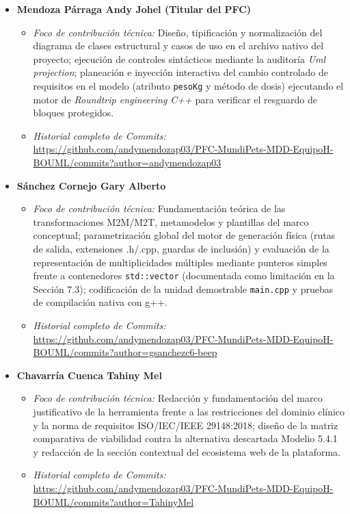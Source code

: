 \documentclass[journal,onecolumn]{IEEEtran}
\begin{document}
	\begin{itemize}[leftmargin=*]
		\item \textbf{Mendoza Párraga Andy Johel (Titular del PFC)}
		\begin{itemize}
			\item \textit{Foco de contribución técnica:} Diseño, tipificación y normalización del diagrama de clases estructural y casos de uso en el archivo nativo del proyecto; ejecución de controles sintácticos mediante la auditoría \textit{Uml projection}; planeación e inyección interactiva del cambio controlado de requisitos en el modelo (atributo \texttt{pesoKg} y método de dosis) ejecutando el motor de \textit{Roundtrip engineering C++} para verificar el resguardo de bloques protegidos.
			\item \textit{Historial completo de Commits:} \\
			\url{https://github.com/andymendozap03/PFC-MundiPets-MDD-EquipoH-BOUML/commits?author=andymendozap03}
		\end{itemize}
		
		\item \textbf{Sánchez Cornejo Gary Alberto}
		\begin{itemize}
			\item \textit{Foco de contribución técnica:} Fundamentación teórica de las transformaciones M2M/M2T, metamodelos y plantillas del marco conceptual; parametrización global del motor de generación física (rutas de salida, extensiones .h/.cpp, guardas de inclusión) y evaluación de la representación de multiplicidades múltiples mediante punteros simples frente a contenedores \texttt{std::vector} (documentada como limitación en la Sección 7.3); codificación de la unidad demostrable \texttt{main.cpp} y pruebas de compilación nativa con g++.
			\item \textit{Historial completo de Commits:} \\
			\url{https://github.com/andymendozap03/PFC-MundiPets-MDD-EquipoH-BOUML/commits?author=gsanchezc6-beep}
		\end{itemize}
		
		\item \textbf{Chavarría Cuenca Tahiny Mel}
		\begin{itemize}
			\item \textit{Foco de contribución técnica:} Redacción y fundamentación del marco justificativo de la herramienta frente a las restricciones del dominio clínico y la norma de requisitos ISO/IEC/IEEE 29148:2018; diseño de la matriz comparativa de viabilidad contra la alternativa descartada Modelio 5.4.1 y redacción de la sección contextual del ecosistema web de la plataforma.
			\item \textit{Historial completo de Commits:} \\
			\url{https://github.com/andymendozap03/PFC-MundiPets-MDD-EquipoH-BOUML/commits?author=TahinyMel}
		\end{itemize}
	\end{itemize}
	
\end{document}
